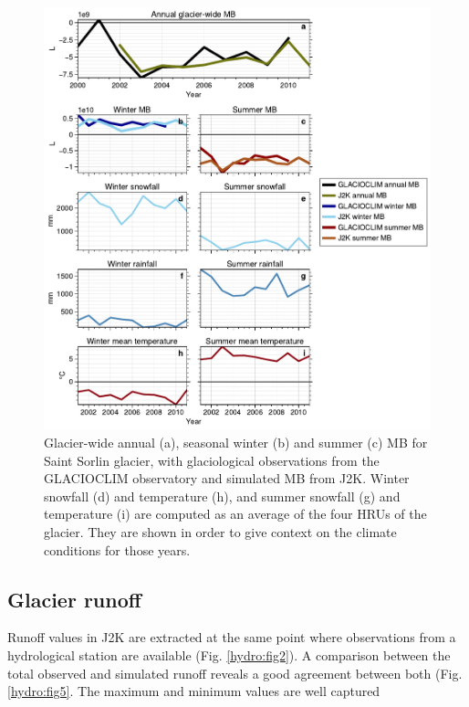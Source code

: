 \begin{figure}[h]
\centering
\includegraphics[width=15cm]{Figures/hydro/Figure_4.pdf}
\caption{Glacier-wide annual (a), seasonal winter (b) and summer (c) MB for Saint Sorlin glacier, with glaciological observations from the GLACIOCLIM observatory and simulated MB from J2K. Winter snowfall (d) and temperature (h), and summer snowfall (g) and temperature (i) are computed as an average of the four HRUs of the glacier. They are shown in order to give context on the climate conditions for those years.} 
\label{hydro:fig3}
\end{figure}


\subsection{Glacier runoff}

Runoff values in J2K are extracted at the same point where observations from a hydrological station are available (Fig. \ref{hydro:fig2}). A comparison between the total observed  and simulated runoff reveals a good agreement between both (Fig. \ref{hydro:fig5}. The maximum and minimum values are well captured 

